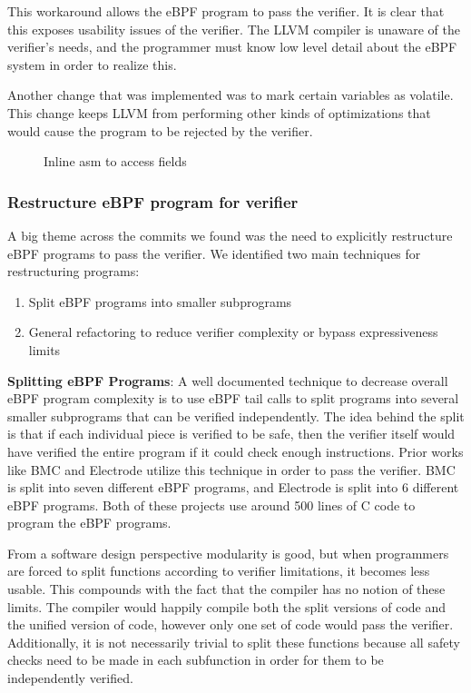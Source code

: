 This workaround allows the eBPF program to pass the verifier.
It is clear that this exposes usability issues of the verifier.
The LLVM compiler is unaware of the verifier's needs, and the programmer must know low level detail about the eBPF system in order to realize this.

Another change that was implemented was to mark certain variables as volatile.
This change keeps LLVM from performing other kinds of optimizations that would cause the program to be rejected by the verifier.

\begin{figure}
    
    \caption{Inline asm to access fields}
    \label{fig:inline-asm}
\end{figure}

\subsubsection{Restructure eBPF program for verifier}
A big theme across the commits we found was the need to explicitly restructure eBPF programs to pass the verifier.
We identified two main techniques for restructuring programs:

\begin{enumerate}
    \item Split eBPF programs into smaller subprograms
    \item General refactoring to reduce verifier complexity or bypass expressiveness limits
\end{enumerate}

\textbf{Splitting eBPF Programs}:
A well documented technique to decrease overall eBPF program complexity is to use eBPF tail calls to split programs into several smaller subprograms that can be verified independently.
The idea behind the split is that if each individual piece is verified to be safe, then the verifier itself would have verified the entire program if it could check enough instructions.
Prior works like BMC\cite{BMC} and Electrode\cite{Electrode} utilize this technique in order to pass the verifier.
BMC is split into seven different eBPF programs, and Electrode is split into 6 different eBPF programs.
Both of these projects use around 500 lines of C code to program the eBPF programs.

From a software design perspective modularity is good, but when programmers are forced to split functions according to verifier limitations, it becomes less usable.
This compounds with the fact that the compiler has no notion of these limits.
The compiler would happily compile both the split versions of code and the unified version of code, however only one set of code would pass the verifier.
Additionally, it is not necessarily trivial to split these functions because all safety checks need to be made in each subfunction in order for them to be independently verified.

